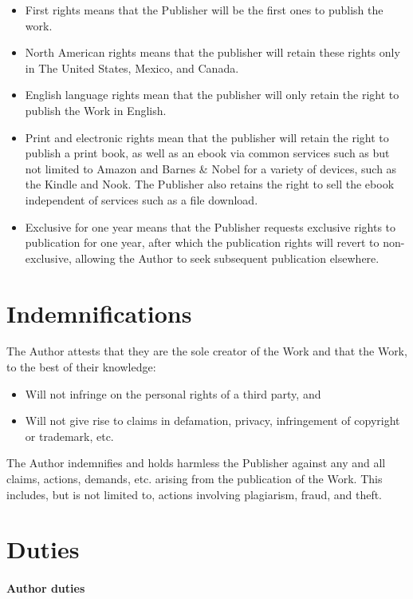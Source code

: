 \documentclass[12pt,letterpaper]{article}
\begin{document}
\begin{itemize}
    \item First rights means that the Publisher will be the first ones to publish the work.
    \item North American rights means that the publisher will retain these rights only in The United States, Mexico, and Canada.
    \item English language rights mean that the publisher will only retain the right to publish the Work in English.
    \item Print and electronic rights mean that the publisher will retain the right to publish a print book, as well as an ebook via common services such as but not limited to Amazon and Barnes \& Nobel for a variety of devices, such as the Kindle and Nook. The Publisher also retains the right to sell the ebook independent of services such as a file download.
    \item Exclusive for one year means that the Publisher requests exclusive rights to publication for one year, after which the publication rights will revert to non-exclusive, allowing the Author to seek subsequent publication elsewhere.
\end{itemize}

\section{Indemnifications}

The Author attests that they are the sole creator of the Work and that the Work, to the best of their knowledge:

\begin{itemize}
    \item Will not infringe on the personal rights of a third party, and
    \item Will not give rise to claims in defamation, privacy, infringement of copyright or trademark, etc.
\end{itemize}

The Author indemnifies and holds harmless the Publisher against any and all claims, actions, demands, etc. arising from the publication of the Work. This includes, but is not limited to, actions involving plagiarism, fraud, and theft.

\section{Duties}

\paragraph{Author duties}
\end{document}
